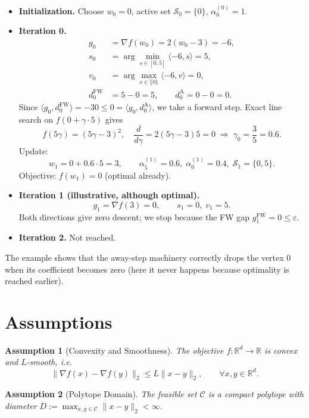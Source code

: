 \documentclass{article}
\newtheorem{assumption}{Assumption}[section]
\begin{document}
\begin{itemize}
\item \textbf{Initialization.} Choose $w_0=0$, active set $\mathcal{S}_0=\{0\}$, $\alpha_0^{(0)}=1$.
\item \textbf{Iteration 0.}
    \begin{align*}
    g_0&=\nabla f(w_0)=2(w_0-3)=-6,\\
    s_0&=\arg\min_{s\in[0,5]}\langle -6,s\rangle =5,\\
    v_0&=\arg\max_{v\in\{0\}}\langle -6,v\rangle =0,\\
    d^{\text{FW}}_0&=5-0=5,\qquad d^{\text{A}}_0=0-0=0.
    \end{align*}
    Since $\langle g_0,d^{\text{FW}}_0\rangle=-30\le 0=\langle g_0,d^{\text{A}}_0\rangle$, we take a forward step.
    Exact line search on $f(0+\gamma\cdot5)$ gives
    \[
    f(5\gamma)=(5\gamma-3)^2,\quad \frac{d}{d\gamma}=2(5\gamma-3)5=0\;\Rightarrow\;\gamma_0=\frac{3}{5}=0.6.
    \]
    Update:
    \[
    w_1=0+0.6\cdot5=3,\qquad 
    \alpha_{5}^{(1)}=0.6,\;\alpha_{0}^{(1)}=0.4,\;\mathcal{S}_1=\{0,5\}.
    \]
    Objective: $f(w_1)=0$ (optimal already).
\item \textbf{Iteration 1 (illustrative, although optimal).}
    \[
    g_1=\nabla f(3)=0,\qquad s_1=0,\; v_1=5.
    \]
    Both directions give zero descent; we stop because the FW gap $g_1^{\text{FW}}=0\le\varepsilon$.
\item \textbf{Iteration 2.} Not reached.
\end{itemize}
The example shows that the away‑step machinery correctly drops the vertex $0$ when its coefficient becomes zero (here it never happens because optimality is reached earlier).

\newpage
\section*{Assumptions}
\begin{assumption}[Convexity and Smoothness]\label{ass:convex-smooth}
The objective $f:\mathbb{R}^d\to\mathbb{R}$ is convex and $L$‑smooth, i.e.
\[
\|\nabla f(x)-\nabla f(y)\|_2\le L\|x-y\|_2,\qquad\forall x,y\in\mathbb{R}^d .
\]
\end{assumption}

\begin{assumption}[Polytope Domain]\label{ass:polytope}
The feasible set $\mathcal{C}$ is a compact polytope with diameter $D:=\max_{x,y\in\mathcal{C}}\|x-y\|_2<\infty$.
\end{assumption}
\end{document}
